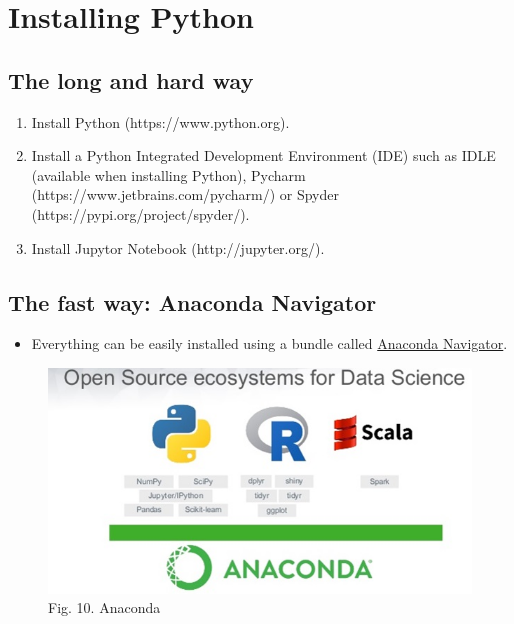 \documentclass[11pt]{article}
\makeatletter
\def\maxwidth{\ifdim\Gin@nat@width>\linewidth\linewidth
    \else\Gin@nat@width\fi}
\let\Oldincludegraphics\includegraphics
\renewcommand{\includegraphics}[1]{\Oldincludegraphics[width=.8\maxwidth]{#1}}
\providecommand{\tightlist}{%
      \setlength{\itemsep}{0pt}\setlength{\parskip}{0pt}}
\makeatother
\begin{document}
    \hypertarget{installing-python}{%
\section{Installing Python}\label{installing-python}}

    \hypertarget{the-long-and-hard-way}{%
\subsection{The long and hard way}\label{the-long-and-hard-way}}

\begin{enumerate}
\def\labelenumi{\arabic{enumi}.}
\tightlist
\item
  Install Python (https://www.python.org).
\item
  Install a Python Integrated Development Environment (IDE) such as IDLE
  (available when installing Python), Pycharm
  (https://www.jetbrains.com/pycharm/) or Spyder
  (https://pypi.org/project/spyder/).
\item
  Install Jupytor Notebook (http://jupyter.org/).
\end{enumerate}

    \hypertarget{the-fast-way-anaconda-navigator}{%
\subsection{The fast way: Anaconda
Navigator}\label{the-fast-way-anaconda-navigator}}

\begin{itemize}
\tightlist
\item
  Everything can be easily installed using a bundle called
  \href{https://www.anaconda.com/download/}{Anaconda Navigator}.
\end{itemize}

\begin{figure}[H]
\centering
\includegraphics{figs/anaconda.jpg}
\caption{Fig. 10. Anaconda}
\end{figure}
\end{document}
